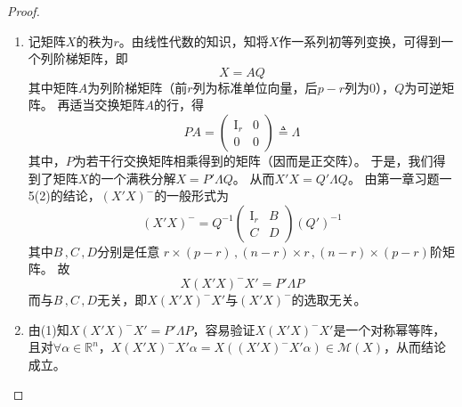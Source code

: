 \documentclass[10pt]{article}
\theoremstyle{definition}
\theoremstyle{definition}
\begin{document}
\begin{enumerate}
        \begin{proof}
            \begin{enumerate}[label=(\roman*)]
                \item
                    记矩阵$X$的秩为$r$。由线性代数的知识，知将$X$作一系列初等列变换，可得到一个列阶梯矩阵，即
                    \begin{equation*}
                        X=AQ
                    \end{equation*}
                    其中矩阵$A$为列阶梯矩阵（前$r$列为标准单位向量，后$p-r$列为0），$Q$为可逆矩阵。
                    再适当交换矩阵$A$的行，得
                    \begin{equation*}
                        PA=
                        \begin{pmatrix}
                            \mathrm{I}_r & 0 \\
                            0 & 0
                        \end{pmatrix}\triangleq \Lambda
                    \end{equation*}
                    其中，$P$为若干行交换矩阵相乘得到的矩阵（因而是正交阵）。
                    于是，我们得到了矩阵$X$的一个满秩分解$X=P'\Lambda Q$。
                    从而$X'X=Q'\Lambda Q$。
                    由第一章习题一5(2)的结论，$(X'X)^-$的一般形式为
                    \begin{equation*}
                        (X'X)^-=Q^{-1}
                        \begin{pmatrix}
                            \mathrm{I}_r & B \\
                            C & D
                        \end{pmatrix}(Q')^{-1}
                    \end{equation*}
                    其中$B\, ,C\, ,D$分别是任意
                    $r\times (p-r)\, ,(n-r)\times r\, ,(n-r)\times (p-r)$阶矩阵。
                    故
                    \begin{equation*}
                        X(X'X)^-X'=P'\Lambda P
                    \end{equation*}
                    而与$B\, ,C\, ,D$无关，即$X(X'X)^-X'$与$(X'X)^-$的选取无关。
                \item
                    由(1)知$X(X'X)^-X'=P'\Lambda P$，容易验证$X(X'X)^-X'$是一个对称幂等阵，且对$\forall \alpha \in \mathbb{R}^n$，$X(X'X)^-X'\alpha =X((X'X)^-X'\alpha)\in \mathcal{M}(X)$，从而结论成立。
            \end{enumerate}
        \end{proof}


\end{enumerate}
\end{document}
